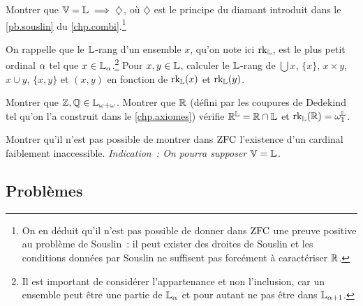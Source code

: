 \begin{exercise}
  Montrer que $\mathbb V = \mathbb L\implies\diamondsuit$, où $\diamondsuit$ est le principe
  du diamant introduit dans le \cref{pb.souslin} du
  \cref{chp.combi}.\footnote{On en déduit qu'il n'est pas possible de donner
  dans $\operatorname{ZFC}$ une preuve positive au problème de Souslin~: il peut exister des
  droites de Souslin et les conditions données par Souslin ne suffisent pas
  forcément à caractériser $\mathbb R$.}
\end{exercise}

\begin{exercise}
  On rappelle que le $\mathbb L$-rang d'un ensemble $x$, qu'on note ici $\operatorname{rk}_{\mathbb L}$,
  est le plus petit ordinal $\alpha$ tel que $x \in \mathbb L_{\alpha}$.\footnote{Il est
  important de considérer l'appartenance et non l'inclusion, car un ensemble
  peut être une partie de $\mathbb L_{\alpha}$ et pour autant ne pas être dans
  $\mathbb L_{\alpha+1}$.} Pour $x,y \in \mathbb L$, calculer le $\mathbb L$-rang de
  $\bigcup x$, $\{x\}$, $x\times y$, $x \cup y$, $\{x,y\}$ et $(x,y)$ en
  fonction de $\operatorname{rk}_{\mathbb L}(x)$ et $\operatorname{rk}_{\mathbb L}(y)$.

  Montrer que $\mathbb Z,\mathbb Q \in \mathbb L_{\omega+\omega}$. Montrer que $\mathbb R$ (défini par les
  coupures de Dedekind tel qu'on l'a construit dans le \cref{chp.axiomes})
  vérifie $\mathbb R^{\mathbb L} = \mathbb R\cap\mathbb L$ et $\operatorname{rk}_{\mathbb L}(\mathbb R) = \omega_1^{\mathbb L}$.
\end{exercise}

\begin{exercise}
  Montrer qu'il n'est pas possible de montrer dans $\operatorname{ZFC}$ l'existence d'un
  cardinal faiblement inaccessible. \textit{Indication~: On pourra supposer
  $\mathbb V = \mathbb L$.}
\end{exercise}

\clearpage

\subsection{Problèmes}

